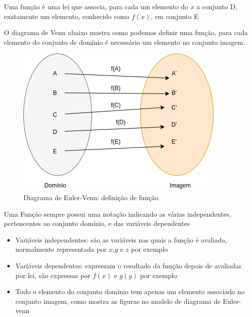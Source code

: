 \begin{multicols*}{2}
    \begin{theorem}
        Uma função é uma lei que associa, para cada um elemento do $x$ a conjunto D, exatamente 				um elemento, conhecido como $f(x)$, em conjunto E
    \end{theorem}
    O diagrama de Venn abaixo mostra como podemos definir uma função, para cada elemento do 				conjunto de domínio é necessário um elemento no conjunto imagem.

    \begin{figure}[H]
        \centering
        \caption{Diagrama de Euler-Venn: definição de função}
        \includegraphics[scale=0.4]{assets/rafael/img.png}
    \end{figure}
    Uma Função sempre possui uma notação indicando as várias independentes, pertencentes ao 				conjunto domínio, e das variáveis dependentes
    \begin{itemize}[wide, labelwidth=!, labelindent=0pt]
        \item Variáveis independentes: são as variáveis nas quais a função é avaliada, 											normalmente representada por $x$,$y$ e $z$ por exemplo
        \item Variáveis dependentes: expressam o resultado da função depois de avaliadas por 							lei, são expressas por $f(x)$ e $g(y)$ por exemplo
        \item Todo o elemento do conjunto domínio tem apenas um elemento associado no conjunto 							imagem, como mostra as figuras no modelo de diagrama de Euler-venn
    \end{itemize}


\end{multicols*}
